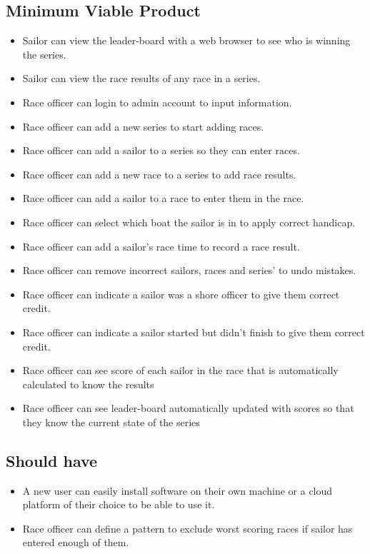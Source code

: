 \documentclass{l4proj}
\begin{document}
\subsection{Minimum Viable Product}
\begin{itemize}
    \item
    Sailor can view the leader-board with a web browser to see who is winning the series.
    \item
    Sailor can view the race results of any race in a series.
    \item
    Race officer can login to admin account to input information.
    \item
    Race officer can add a new series to start adding races.
    \item
    Race officer can add a sailor to a series so they can enter races.
    \item
    Race officer can add a new race to a series to add race results.
    \item
    Race officer can add a sailor to a race to enter them in the race.
    \item
    Race officer can select which boat the sailor is in to apply
    correct handicap.
    \item
    Race officer can add a sailor’s race time to record a race result.
    \item
    Race officer can remove incorrect sailors, races and series’ to undo mistakes.
    \item
    Race officer can indicate a sailor was a shore officer to give them correct credit.
    \item
    Race officer can indicate a sailor started but didn't finish to give them correct credit.
    \item
    Race officer can see score of each sailor in the race that is automatically calculated to know the results
    \item
    Race officer can see leader-board automatically updated with scores so that they know the current state of the series
\end{itemize}

\subsection{Should have}

\begin{itemize}
    \item
    A new user can easily install software on their own machine or a cloud platform of their choice to be able to use it.
    \item
    Race officer can define a pattern to exclude worst scoring races if sailor has entered enough of them.
\end{itemize}
\end{document}
